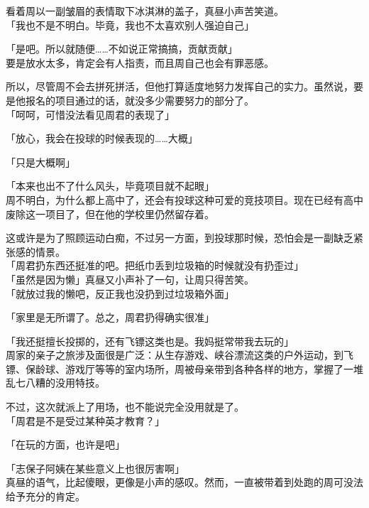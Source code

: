 看着周以一副皱眉的表情取下冰淇淋的盖子，真昼小声苦笑道。\\

「我也不是不明白。毕竟，我也不太喜欢别人强迫自己」

「是吧。所以就随便……不如说正常搞搞，贡献贡献」\\

要是放水太多，肯定会有人指责，而且周自己也会有罪恶感。

所以，尽管周不会去拼死拼活，但他打算适度地努力发挥自己的实力。虽然说，要是他报名的项目通过的话，就没多少需要努力的部分了。\\

「呵呵，可惜没法看见周君的表现了」

「放心，我会在投球的时候表现的……大概」

「只是大概啊」

「本来也出不了什么风头，毕竟项目就不起眼」\\

周不明白，为什么都上高中了，还会有投球这种可爱的竞技项目。现在已经有高中废除这一项目了，但在他的学校里仍然留存着。

这或许是为了照顾运动白痴，不过另一方面，到投球那时候，恐怕会是一副缺乏紧张感的情景。\\

「周君扔东西还挺准的吧。把纸巾丢到垃圾箱的时候就没有扔歪过」\\

「虽然是因为懒」真昼又小声补了一句，让周只得苦笑。\\

「就放过我的懒吧，反正我也没扔到过垃圾箱外面」

「家里是无所谓了。总之，周君扔得确实很准」

「我还挺擅长投掷的，还有飞镖这类也是。我妈挺常带我去玩的」\\

周家的亲子之旅涉及面很是广泛：从生存游戏、峡谷漂流这类的户外运动，到飞镖、保龄球、游戏厅等等的室内场所，周被母亲带到各种各样的地方，掌握了一堆乱七八糟的没用特技。

不过，这次就派上了用场，也不能说完全没用就是了。\\

「周君是不是受过某种英才教育？」

「在玩的方面，也许是吧」

「志保子阿姨在某些意义上也很厉害啊」\\

真昼的语气，比起傻眼，更像是小声的感叹。然而，一直被带着到处跑的周可没法给予充分的肯定。\\

